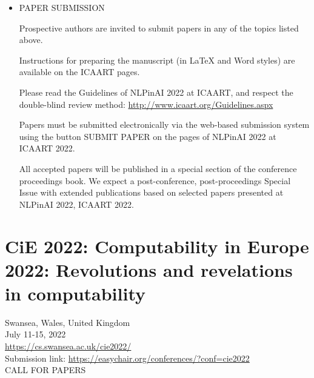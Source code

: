 \documentclass[prodmode,acmtecs]{acmsmall} %
\begin{document}
\begin{itemize}
\item  PAPER SUBMISSION  
 
  Prospective authors are invited to submit papers in any of the topics listed above. 
 
  Instructions for preparing the manuscript (in LaTeX and Word styles) are available on the ICAART pages. 
 
  Please read the Guidelines of NLPinAI 2022 at ICAART, and respect the double-blind review method: \href{http://www.icaart.org/Guidelines.aspx}{http://www.icaart.org/Guidelines.aspx} 
 
  Papers must be submitted electronically via the web-based submission system using the button SUBMIT PAPER on the pages of  NLPinAI 2022 at ICAART 2022. 
 
  All accepted papers will be published in a special section of the conference proceedings book. We expect a post-conference, post-proceedings Special Issue with extended publications based on selected papers presented at NLPinAI 2022, ICAART 2022. 
 
\end{itemize}\section{CiE 2022: Computability in Europe 2022: Revolutions and revelations in computability}\label{CiE2022}  Swansea, Wales, United Kingdom\\ 
  July 11-15, 2022\\ 
  \href{https://cs.swansea.ac.uk/cie2022/}{https://cs.swansea.ac.uk/cie2022/}\\ 
  Submission link: \href{https://easychair.org/conferences/?conf=cie2022}{https://easychair.org/conferences/?conf=cie2022}\\ 
CALL FOR PAPERS 
\end{document}
